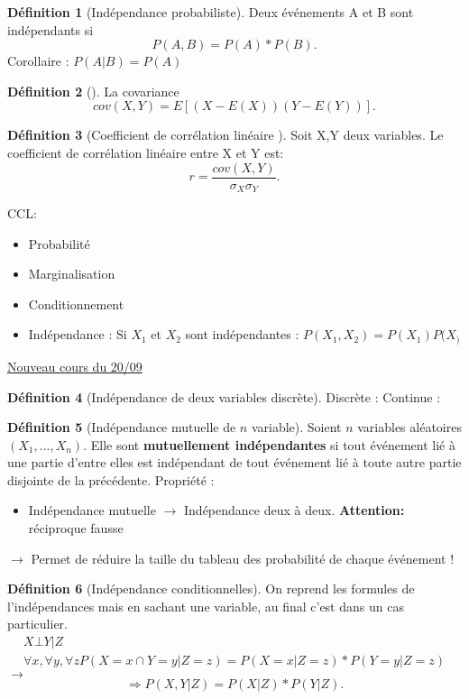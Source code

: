 \documentclass{article}
\theoremstyle{plain}%
\theoremstyle{definition}
\newtheorem{defn}{Définition}[section]
\theoremstyle{remark}
\begin{document}
\begin{defn}[Indépendance probabiliste]
    Deux événements A et B sont indépendants si 
    \[
        P(A,B) = P(A) * P(B)
    .\]
    Corollaire : $ P(A|B) = P(A) $ 
\end{defn}

\begin{defn}[]
    La covariance 
    \[
        cov(X,Y) = E[(X-E(X))(Y-E(Y))]
    .\]
\end{defn}

\begin{defn}[Coefficient de corrélation linéaire ]
    Soit X,Y deux variables. Le coefficient de corrélation linéaire entre X et Y est:
    \[
        r = \frac{cov(X,Y)}{\sigma _X \sigma _Y}
    .\]
\end{defn}

CCL:
\begin{itemize} VOIR DIAPO
    \item Probabilité
    \item Marginalisation
    \item Conditionnement
    \item Indépendance : Si $ X_1 $ et $ X_2 $ sont indépendantes : $ P(X_1, X_2) = P(X_1)P(X_) $ 
\end{itemize}

\underline{Nouveau cours du 20/09} \\
\begin{defn}[Indépendance de deux variables discrète]
    Discrète : 
    Continue : 
\end{defn}
\begin{defn}[Indépendance mutuelle de $ n $ variable]
    Soient $ n $ variables aléatoires $ (X_1, ..., X_n) $. Elle sont \textbf{mutuellement indépendantes} si tout événement lié à une partie d'entre elles est indépendant de tout événement lié à toute autre partie disjointe de la précédente.
    Propriété : \begin{itemize}
        \item Indépendance mutuelle $\rightarrow$ Indépendance deux à deux. \textbf{Attention:} réciproque fausse
    \end{itemize}

    $\rightarrow$ Permet de réduire la taille du tableau des probabilité de chaque événement !
\end{defn}

\begin{defn}[Indépendance conditionnelles]
    On reprend les formules de l'indépendances mais en sachant une variable, au final c'est dans un cas particulier. 
    \begin{align*}
        X \bot Y | Z \\
        \forall x, \forall y, \forall z P(X=x \cap  Y=y | Z = z) = P(X=x|Z=z) * P(Y=y|Z=z)
    \end{align*}
    $\rightarrow$ 
    \[
        \Rightarrow P(X,Y | Z) = P(X|Z)*P(Y|Z)
    .\]
\end{defn}
\end{document}
